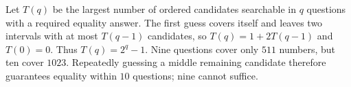 Let $T(q)$ be the largest number of ordered candidates searchable in $q$ questions with a required equality answer. The first guess covers itself and leaves two intervals with at most $T(q-1)$ candidates, so $T(q)=1+2T(q-1)$ and $T(0)=0$. Thus $T(q)=2^q-1$. Nine questions cover only $511$ numbers, but ten cover $1023$. Repeatedly guessing a middle remaining candidate therefore guarantees equality within $\boxed{10}$ questions; nine cannot suffice.
